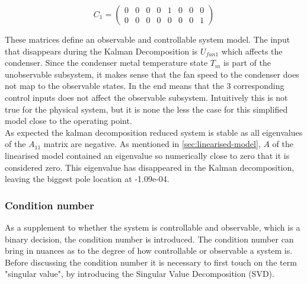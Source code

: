 \begin{equation}  \label{eq:C1}
	C_1 =\left(\begin{array}{cccccccc}
		0 &    0 &    0 &    0 &    1 &    0 &    0 &    0 \\
		0 &    0 &    0 &    0 &    0 &    0 &    0 &    1
	\end{array}\right)
\end{equation}

\smallskip
\noindent These matrices define an observable and controllable system model. The input that disappears during the Kalman Decomposition is $ U_{fan1} $ which affects the condenser. Since the condenser metal temperature state $ T_m $ is part of the unobservable subsystem, it makes sense that the fan speed to the condenser does not map to the observable states. In the end means that the 3 corresponding control inputs does not affect the observable subsystem. Intuitively this is not true for the physical system, but it is none the less the case for this simplified model close to the operating point.\\

As expected the kalman decomposition reduced system is stable as all eigenvalues of the $A_{11}$ matrix are negative. As mentioned in \cref{sec:linearised-model}, $A$ of the linearised model contained an eigenvalue so numerically close to zero that it is considered zero. This eigenvalue has disappeared in the Kalman decomposition, leaving the biggest pole location at -1.09e-04.

\subsubsection{Condition number} \label{sec:condNumber}
As a supplement to whether the system is controllable and observable, which is a binary decision, the condition number is introduced. The condition number can bring in nuances as to the degree of how controllable or observable a system is. Before discussing the condition number it is necessary to first touch on the term "singular value", by introducing the Singular Value Decomposition (SVD).\\

